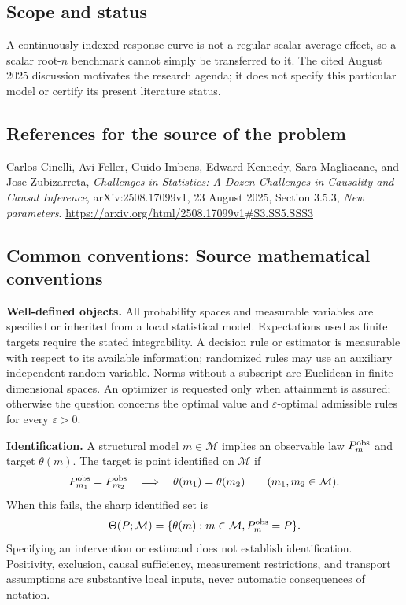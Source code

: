 \documentclass[11pt,a4paper]{article}
\begin{document}
\subsection*{Scope and status}
A continuously indexed response curve is not a regular scalar average effect, so a scalar root-$n$ benchmark cannot simply be transferred to it. The cited August 2025 discussion motivates the research agenda; it does not specify this particular model or certify its present literature status.
\subsection*{References for the source of the problem}
Carlos Cinelli, Avi Feller, Guido Imbens, Edward Kennedy, Sara Magliacane, and Jose Zubizarreta, \emph{Challenges in Statistics: A Dozen Challenges in Causality and Causal Inference}, arXiv:2508.17099v1, 23 August 2025, Section 3.5.3, \emph{New parameters}.
\url{https://arxiv.org/html/2508.17099v1#S3.SS5.SSS3}

\subsection*{Common conventions: Source mathematical conventions}

\textbf{Well-defined objects.}
All probability spaces and measurable variables are specified or inherited
from a local statistical model. Expectations used as finite targets require
the stated integrability. A decision rule or estimator is measurable with
respect to its available information; randomized rules may use an auxiliary
independent random variable. Norms without a subscript are Euclidean in
finite-dimensional spaces. An optimizer is requested only when attainment
is assured; otherwise the question concerns the optimal value and
$\varepsilon$-optimal admissible rules for every $\varepsilon>0$.

\textbf{Identification.}
A structural model $m\in\mathcal M$ implies an observable law
$P_m^{\rm obs}$ and target $\theta(m)$. The target is point identified on
$\mathcal M$ if
\[
 P_{m_1}^{\rm obs}=P_{m_2}^{\rm obs}
 \quad\Longrightarrow\quad\theta(m_1)=\theta(m_2)
 \qquad(m_1,m_2\in\mathcal M).
\]
When this fails, the sharp identified set is
\[
 \Theta(P;\mathcal M)=\{\theta(m):m\in\mathcal M,
                                  P_m^{\rm obs}=P\}.
\]
Specifying an intervention or estimand does not establish identification.
Positivity, exclusion, causal sufficiency, measurement restrictions, and
transport assumptions are substantive local inputs, never automatic
consequences of notation.
\end{document}
